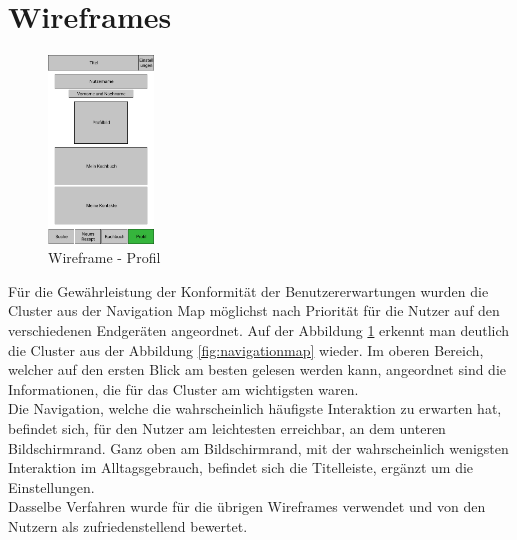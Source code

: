\section{Wireframes}
\begin{figure}
  \centering
    \includegraphics[width=0.25\textwidth]{images/wf-profil.jpg}
  \centering
\caption[Wireframe - Profil]{Wireframe - Profil}
\label{fig:wfprofil}
\end{figure}
Für die Gewährleistung der Konformität der Benutzererwartungen wurden die Cluster aus der Navigation Map möglichst nach Priorität für die Nutzer auf den verschiedenen Endgeräten angeordnet. Auf der Abbildung \ref{fig:wfprofil} erkennt man deutlich die Cluster aus der Abbildung \ref{fig:navigationmap} wieder. Im oberen Bereich, welcher auf den ersten Blick am besten gelesen werden kann, angeordnet sind die Informationen, die für das Cluster am wichtigsten waren.\\ 
Die Navigation, welche die wahrscheinlich häufigste Interaktion zu erwarten hat, befindet sich, für den Nutzer am leichtesten erreichbar, an dem unteren Bildschirmrand. Ganz oben am Bildschirmrand, mit der wahrscheinlich wenigsten Interaktion im Alltagsgebrauch, befindet sich die Titelleiste, ergänzt um die Einstellungen. \\ Dasselbe Verfahren wurde für die übrigen Wireframes verwendet und von den Nutzern als zufriedenstellend bewertet. \\

